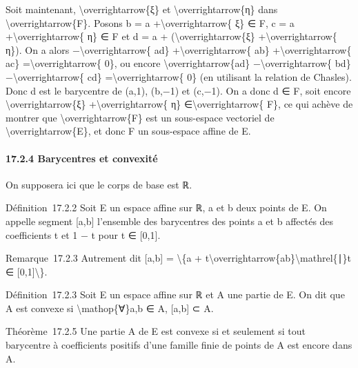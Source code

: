\documentclass[]{article}
\begin{document}
Soit maintenant, \textbackslash{}overrightarrow\{ξ\} et
\textbackslash{}overrightarrow\{η\} dans
\textbackslash{}overrightarrow\{F\}. Posons b = a
+\textbackslash{}overrightarrow\{ ξ\} ∈ F, c = a
+\textbackslash{}overrightarrow\{ η\} ∈ F et d = a +
(\textbackslash{}overrightarrow\{ξ\} +\textbackslash{}overrightarrow\{
η\}). On a alors −\textbackslash{}overrightarrow\{ ad\}
+\textbackslash{}overrightarrow\{ ab\} +\textbackslash{}overrightarrow\{
ac\} =\textbackslash{}overrightarrow\{ 0\}, ou encore
\textbackslash{}overrightarrow\{ad\} −\textbackslash{}overrightarrow\{
bd\} −\textbackslash{}overrightarrow\{ cd\}
=\textbackslash{}overrightarrow\{ 0\} (en utilisant la relation de
Chasles). Donc d est le barycentre de (a,1), (b,−1) et (c,−1). On a donc
d ∈ F, soit encore \textbackslash{}overrightarrow\{ξ\}
+\textbackslash{}overrightarrow\{ η\} ∈\textbackslash{}overrightarrow\{
F\}, ce qui achève de montrer que \textbackslash{}overrightarrow\{F\}
est un sous-espace vectoriel de \textbackslash{}overrightarrow\{E\}, et
donc F un sous-espace affine de E.

\paragraph{17.2.4 Barycentres et convexité}

On supposera ici que le corps de base est ℝ.

Définition~17.2.2 Soit E un espace affine sur ℝ, a et b deux points de
E. On appelle segment {[}a,b{]} l'ensemble des barycentres des points a
et b affectés des coefficients t et 1 − t pour t ∈ {[}0,1{]}.

Remarque~17.2.3 Autrement dit {[}a,b{]} = \textbackslash{}\{a +
t\textbackslash{}overrightarrow\{ab\}\textbackslash{}mathrel\{∣\}t ∈
{[}0,1{]}\textbackslash{}\}.

Définition~17.2.3 Soit E un espace affine sur ℝ et A une partie de E. On
dit que A est convexe si \textbackslash{}mathop\{∀\}a,b ∈ A, {[}a,b{]} ⊂
A.

Théorème~17.2.5 Une partie A de E est convexe si et seulement si tout
barycentre à coefficients positifs d'une famille finie de points de A
est encore dans A.
\end{document}
